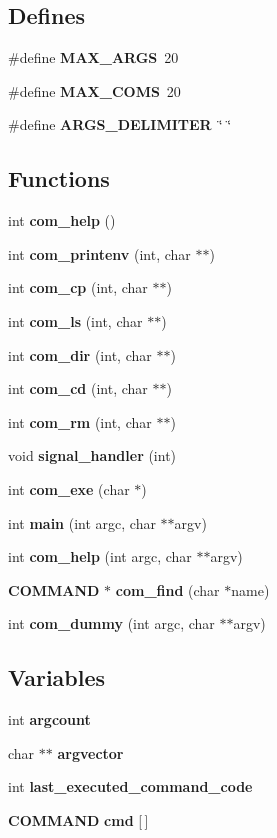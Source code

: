 \subsection*{Defines}
\begin{DoxyCompactItemize}
\item 
\#define {\bf MAX\_\-ARGS}~20
\item 
\#define {\bf MAX\_\-COMS}~20
\item 
\#define {\bf ARGS\_\-DELIMITER}~\char`\"{} \char`\"{}
\end{DoxyCompactItemize}
\subsection*{Functions}
\begin{DoxyCompactItemize}
\item 
int {\bf com\_\-help} ()
\item 
int {\bf com\_\-printenv} (int, char $\ast$$\ast$)
\item 
int {\bf com\_\-cp} (int, char $\ast$$\ast$)
\item 
int {\bf com\_\-ls} (int, char $\ast$$\ast$)
\item 
int {\bf com\_\-dir} (int, char $\ast$$\ast$)
\item 
int {\bf com\_\-cd} (int, char $\ast$$\ast$)
\item 
int {\bf com\_\-rm} (int, char $\ast$$\ast$)
\item 
void {\bf signal\_\-handler} (int)
\item 
int {\bf com\_\-exe} (char $\ast$)
\item 
int {\bf main} (int argc, char $\ast$$\ast$argv)
\item 
int {\bf com\_\-help} (int argc, char $\ast$$\ast$argv)
\item 
{\bf COMMAND} $\ast$ {\bf com\_\-find} (char $\ast$name)
\item 
int {\bf com\_\-dummy} (int argc, char $\ast$$\ast$argv)
\end{DoxyCompactItemize}
\subsection*{Variables}
\begin{DoxyCompactItemize}
\item 
int {\bf argcount}
\item 
char $\ast$$\ast$ {\bf argvector}
\item 
int {\bf last\_\-executed\_\-command\_\-code}
\item 
{\bf COMMAND} {\bf cmd} [$\,$]
\end{DoxyCompactItemize}


